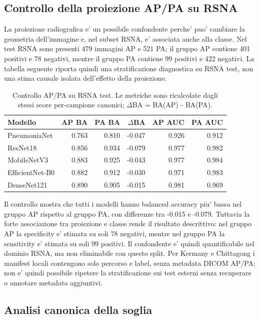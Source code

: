 \documentclass[11pt,a4paper]{article}
\newcommand{\balacc}{balanced accuracy}
\begin{document}
\subsection{Controllo della proiezione AP/PA su RSNA}

La proiezione radiografica e' un possibile confondente perche' puo' cambiare la
geometria dell'immagine e, nel subset RSNA, e' associata anche alla classe. Nel
test RSNA sono presenti 479 immagini AP e 521 PA; il gruppo AP contiene 401
positivi e 78 negativi, mentre il gruppo PA contiene 99 positivi e 422 negativi.
La tabella seguente riporta quindi una stratificazione diagnostica su RSNA test,
non una stima causale isolata dell'effetto della proiezione.

\begin{table}[H]
\centering
\caption{Controllo AP/PA su RSNA test. Le metriche sono ricalcolate dagli stessi score per-campione canonici; \(\Delta\)BA = BA(AP) - BA(PA).}
\label{tab:view-position-rsna}
\begin{tabular}{lrrrrr}
\toprule
Modello & AP BA & PA BA & \(\Delta\)BA & AP AUC & PA AUC \\
\midrule
PneumoniaNet & 0.763 & 0.810 & -0.047 & 0.926 & 0.912 \\
ResNet18 & 0.856 & 0.934 & -0.079 & 0.977 & 0.982 \\
MobileNetV3 & 0.883 & 0.925 & -0.043 & 0.977 & 0.984 \\
EfficientNet-B0 & 0.882 & 0.912 & -0.030 & 0.971 & 0.983 \\
DenseNet121 & 0.890 & 0.905 & -0.015 & 0.981 & 0.969 \\
\bottomrule
\end{tabular}
\end{table}

Il controllo mostra che tutti i modelli hanno \balacc{} piu' bassa nel gruppo
AP rispetto al gruppo PA, con differenze tra -0.015 e -0.079. Tuttavia la forte
associazione tra proiezione e classe rende il risultato descrittivo: nel gruppo
AP la specificity e' stimata su soli 78 negativi, mentre nel gruppo PA la
sensitivity e' stimata su soli 99 positivi. Il confondente e' quindi
quantificabile nel dominio RSNA, ma non eliminabile con questo split. Per
Kermany e Chittagong i manifest locali contengono solo percorso e label, senza
metadata DICOM AP/PA; non e' quindi possibile ripetere la stratificazione sui
test esterni senza recuperare o annotare metadata aggiuntivi.

\subsection{Analisi canonica della soglia}
\end{document}
